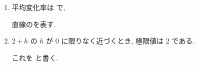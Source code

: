 \documentclass[14pt,dvipdfmx]{jsarticle}
\begin{document}
\vfill
\begin{summarybox}
  \begin{enumerate}[label=\textbf{\arabic*}, leftmargin=1.5zw, itemsep=0.2em]
    \par\vspace{0.5em}
    \item 平均変化率は {\renewcommand{\fitblankpad}{6zw}%
          } で,
          \par\vspace{0.5em}
          直線のを表す.
    \item $2 + h$ の $h$ が $0$ に限りなく近づくとき, 極限値は $2$ である.
          \par\vspace{0.5em}
          これを {\renewcommand{\fitblankpad}{5zw}%
          } と書く.
  \end{enumerate}
\end{summarybox}

\vspace{0.4em}
\end{document}
